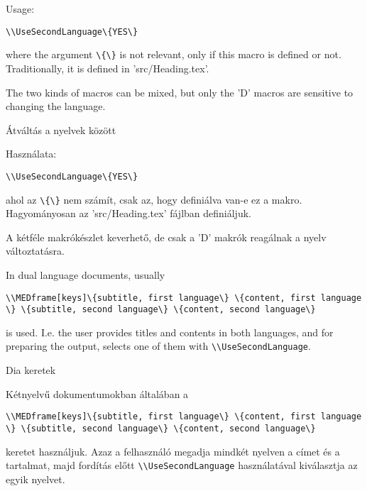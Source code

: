 {

Usage:

\noindent\lstinline|\\UseSecondLanguage\{YES\}|

\noindent where the argument \lstinline|\{\}| is not relevant, only if this macro is defined or not.
Traditionally, it is defined in 'src/Heading.tex'.

The two kinds of macros can be mixed, but only the 'D' macros 
are sensitive to changing the language.
}
{Átváltás a nyelvek között}
{

Használata:

\noindent\lstinline|\\UseSecondLanguage\{YES\}|

\noindent ahol az \lstinline|\{\}| nem számít, csak az, hogy definiálva van-e ez a makro.
Hagyományosan az 'src/Heading.tex' fájlban definiáljuk.

A kétféle makrókészlet keverhető, de csak a 'D' makrók reagálnak 
a nyelv változtatásra.
}


{
In dual language documents, usually 
\par\noindent\lstinline|\\MEDframe[keys]\{subtitle, first language\} \{content, first language \} \{subtitle, second language\} \{content, second language\}|
\par\noindent is used. I.e. the user provides titles and contents in both languages,
and for preparing the output, selects one of them with \lstinline|\\UseSecondLanguage|.
}
{Dia keretek}
{
Kétnyelvű dokumentumokban általában a
\par\noindent\lstinline|\\MEDframe[keys]\{subtitle, first language\} \{content, first language \} \{subtitle, second language\} \{content, second language\}|
\par\noindent  keretet használjuk. Azaz a felhasználó megadja mindkét nyelven
a címet és a tartalmat, majd fordítás előtt \lstinline|\\UseSecondLanguage|
használatával kiválasztja az egyik nyelvet.
}



